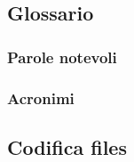 \subsection{Glossario}
\subsubsection{Parole notevoli}
\subsubsection{Acronimi}
\subsection{Codifica files}